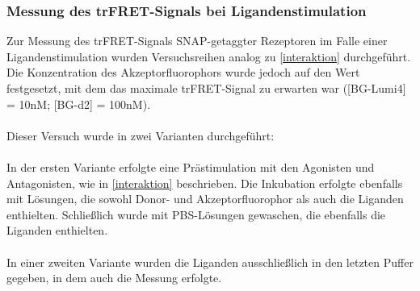 \subsubsection{Messung des trFRET-Signals bei Ligandenstimulation}

Zur Messung des trFRET-Signals SNAP-getaggter Rezeptoren im Falle einer Ligandenstimulation wurden Versuchsreihen analog zu \ref{interaktion} durchgeführt. Die Konzentration des Akzeptorfluorophors wurde jedoch auf den Wert festgesetzt, mit dem das maximale trFRET-Signal zu erwarten war ([BG-Lumi4] = 10\si{\nano M}; [BG-d2] = 100\si{\nano M}).
\\ \\
Dieser Versuch wurde in zwei Varianten durchgeführt:
\\ \\
In der ersten Variante erfolgte eine Prästimulation mit den Agonisten und Antagonisten, wie in \ref{interaktion} beschrieben. Die Inkubation erfolgte ebenfalls mit Lösungen, die sowohl Donor- und Akzeptorfluorophor als auch die Liganden enthielten. Schließlich wurde mit PBS-Lösungen gewaschen, die ebenfalls die Liganden enthielten.
\\ \\
In einer zweiten Variante wurden die Liganden ausschließlich in den letzten Puffer gegeben, in dem auch die Messung erfolgte.

